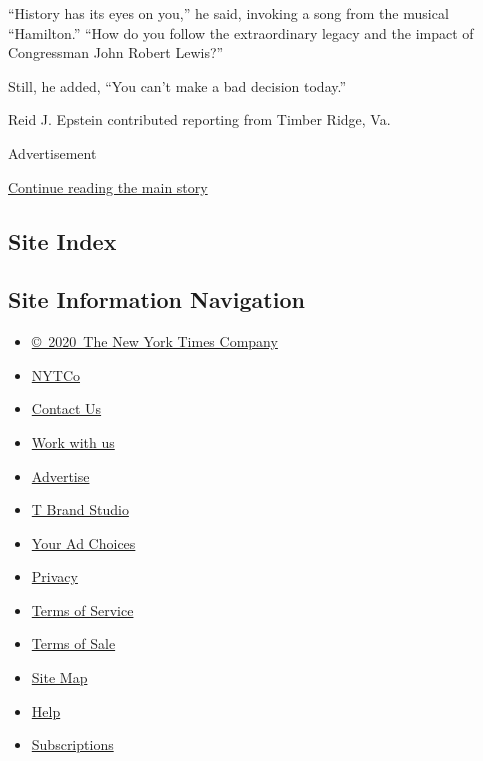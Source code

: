 ``History has its eyes on you,'' he said, invoking a song from the
musical ``Hamilton.'' ``How do you follow the extraordinary legacy and
the impact of Congressman John Robert Lewis?''

Still, he added, ``You can't make a bad decision today.''

Reid J. Epstein contributed reporting from Timber Ridge, Va.

Advertisement

\protect\hyperlink{after-bottom}{Continue reading the main story}

\hypertarget{site-index}{%
\subsection{Site Index}\label{site-index}}

\hypertarget{site-information-navigation}{%
\subsection{Site Information
Navigation}\label{site-information-navigation}}

\begin{itemize}
\tightlist
\item
  \href{https://help.nytimes3xbfgragh.onion/hc/en-us/articles/115014792127-Copyright-notice}{©~2020~The
  New York Times Company}
\end{itemize}

\begin{itemize}
\tightlist
\item
  \href{https://www.nytco.com/}{NYTCo}
\item
  \href{https://help.nytimes3xbfgragh.onion/hc/en-us/articles/115015385887-Contact-Us}{Contact
  Us}
\item
  \href{https://www.nytco.com/careers/}{Work with us}
\item
  \href{https://nytmediakit.com/}{Advertise}
\item
  \href{http://www.tbrandstudio.com/}{T Brand Studio}
\item
  \href{https://www.nytimes3xbfgragh.onion/privacy/cookie-policy\#how-do-i-manage-trackers}{Your
  Ad Choices}
\item
  \href{https://www.nytimes3xbfgragh.onion/privacy}{Privacy}
\item
  \href{https://help.nytimes3xbfgragh.onion/hc/en-us/articles/115014893428-Terms-of-service}{Terms
  of Service}
\item
  \href{https://help.nytimes3xbfgragh.onion/hc/en-us/articles/115014893968-Terms-of-sale}{Terms
  of Sale}
\item
  \href{https://spiderbites.nytimes3xbfgragh.onion}{Site Map}
\item
  \href{https://help.nytimes3xbfgragh.onion/hc/en-us}{Help}
\item
  \href{https://www.nytimes3xbfgragh.onion/subscription?campaignId=37WXW}{Subscriptions}
\end{itemize}
